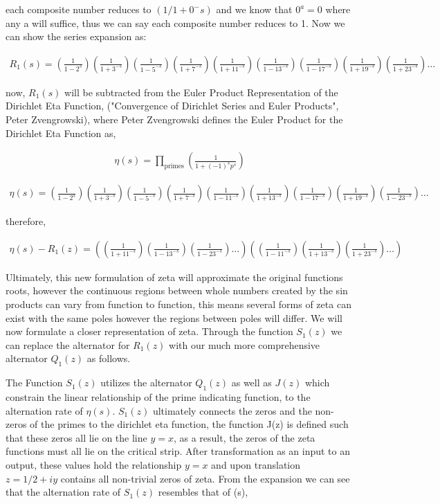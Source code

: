 \documentclass{article}
\begin{document}
each composite number reduces to $(1/1+0^-s)$ and we know that $0^a = 0$ where any a will suffice, thus we can say each composite number reduces to 1. Now we can show the series expansion as:

\begin{align*}
R_1(s) = (\frac{1}{1 - 2^{s}})(\frac{1}{1 + 3^{-s}})(\frac{1}{1 - 5^{-s}})(\frac{1}{1 + 7^{-s}})(\frac{1}{1 + 11^{-s}})(\frac{1}{1 - 13^{-s}})(\frac{1}{1 - 17^{-s}})(\frac{1}{1 + 19^{-s}})(\frac{1}{1 + 23^{-s}}) \ldots
\end{align*}

now, $R_1(s)$ will be subtracted from the Euler Product Representation of the Dirichlet Eta Function, ("Convergence of Dirichlet Series and Euler Products", Peter Zvengrowski), where Peter Zvengrowski defines the Euler Product for the Dirichlet Eta Function as,

\begin{align*}
\eta(s) = \prod_{\text{primes}} \left( \frac{1}{1+(-1)^{s}p^{s}} \right)
\end{align*}

\begin{align*}
\eta(s) = (\frac{1}{1 - 2^{s}})(\frac{1}{1 + 3^{-s}})(\frac{1}{1 - 5^{-s}})(\frac{1}{1 + 7^{-s}})(\frac{1}{1 - 11^{-s}})(\frac{1}{1 + 13^{-s}})(\frac{1}{1 - 17^{-s}})(\frac{1}{1 + 19^{-s}})(\frac{1}{1 - 23^{-s}}) \ldots
\end{align*}

therefore,

\begin{align*}
\eta(s) - R_1(z) =((\frac{1}{1 + 11^{-s}})(\frac{1}{1 - 13^{-s}})(\frac{1}{1 - 23^{-s}}) \ldots)((\frac{1}{1 - 11^{-s}})(\frac{1}{1 + 13^{-s}})(\frac{1}{1 + 23^{-s}}) \ldots)
\end{align*}

Ultimately, this new formulation of zeta will approximate the original functions roots, however the continuous regions between whole numbers created by the sin products can vary from function to function, this means several forms of zeta can exist with the same poles however the regions between poles will differ. We will now formulate a closer representation of zeta. Through the function $S_1(z)$ we can replace the alternator for $R_1(z)$ with our much more comprehensive alternator $Q_1(z)$ as follows.

\newpage
The Function $S_1(z)$ utilizes the alternator $Q_1(z)$ as well as $J(z)$ which constrain the linear relationship of the prime indicating function, to the alternation rate of $\eta(s)$. $S_1(z)$ ultimately connects the zeros and the non-zeros of the primes to the dirichlet eta function, the function J(z) is defined such that these zeros all lie on the line $y = x$, as a result, the zeros of the zeta functions must all lie on the critical strip. After transformation as an input to an output, these values hold the relationship $y=x$ and upon translation $z = 1/2 + iy$ contains all non-trivial zeros of zeta. From the expansion we can see that the alternation rate of $S_1(z)$ resembles that of \eta(s),
\end{document}
